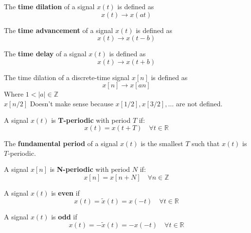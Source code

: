 \begin{definition}
    The \textbf{time dilation} of a signal $x(t)$ is defined as
    \[
        x(t) \to x(at)
    \]
\end{definition}

\begin{definition}
    The \textbf{time advancement} of a signal $x(t)$ is defined as
    \[
        x(t) \to x(t - b)
    \]
\end{definition}

\begin{definition}
    The \textbf{time delay} of a signal $x(t)$ is defined as
    \[
        x(t) \to x(t + b)
    \]
\end{definition}

\begin{corollary}
    The time dilation of a discrete-time signal $x[n]$ is defined as
    \[
        x[n] \to x[an]
    \]
    Where $1< |a| \in \mathbb{Z}$ \\
    $x[n/2]$ Doesn't make sense because $x[1/2], x[3/2], \ldots$ are not defined.
\end{corollary}

\begin{definition}
    A signal $x(t)$ is \textbf{T-periodic} with period $T$ if:
    \[
        x(t) = x(t + T) \quad \forall t \in \mathbb{R}
    \]
\end{definition}

\begin{definition}
    The \textbf{fundamental period} of a signal $x(t)$ is the smallest $T$ such that $x(t)$ is $T$-periodic.
\end{definition}

\begin{definition}
    A signal $x[n]$ is \textbf{N-periodic} with period $N$ if:
    \[
        x[n] = x[n + N] \quad \forall n \in \mathbb{Z}
    \]
\end{definition}

\begin{definition}
    A signal $x(t)$ is \textbf{even} if
    \[
        x(t) = \tilde{x}(t) = x(-t) \quad \forall t \in \mathbb{R}
    \]
\end{definition}

\begin{definition}
    A signal $x(t)$ is \textbf{odd} if
    \[
        x(t) = -\tilde{x}(t) = -x(-t) \quad \forall t \in \mathbb{R}
    \]
\end{definition}

